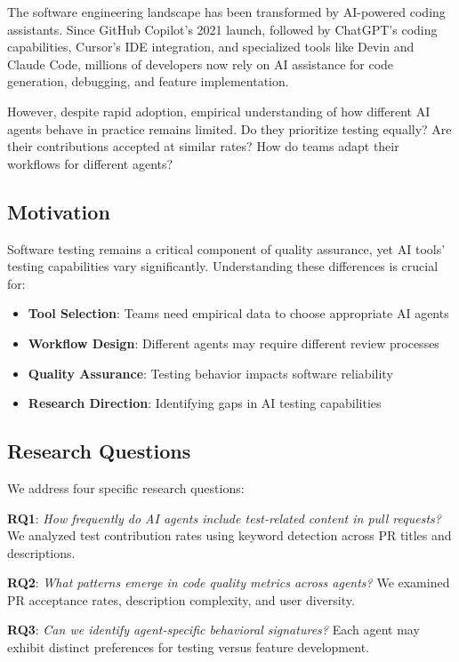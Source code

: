 \documentclass[conference]{IEEEtran}
\begin{document}
The software engineering landscape has been transformed by AI-powered coding assistants. Since GitHub Copilot's 2021 launch, followed by ChatGPT's coding capabilities, Cursor's IDE integration, and specialized tools like Devin and Claude Code, millions of developers now rely on AI assistance for code generation, debugging, and feature implementation.

However, despite rapid adoption, empirical understanding of how different AI agents behave in practice remains limited. Do they prioritize testing equally? Are their contributions accepted at similar rates? How do teams adapt their workflows for different agents?

\subsection{Motivation}

Software testing remains a critical component of quality assurance, yet AI tools' testing capabilities vary significantly. Understanding these differences is crucial for:
\begin{itemize}
    \item \textbf{Tool Selection}: Teams need empirical data to choose appropriate AI agents
    \item \textbf{Workflow Design}: Different agents may require different review processes  
    \item \textbf{Quality Assurance}: Testing behavior impacts software reliability
    \item \textbf{Research Direction}: Identifying gaps in AI testing capabilities
\end{itemize}

\subsection{Research Questions}

We address four specific research questions:

\textbf{RQ1}: \textit{How frequently do AI agents include test-related content in pull requests?} We analyzed test contribution rates using keyword detection across PR titles and descriptions.

\textbf{RQ2}: \textit{What patterns emerge in code quality metrics across agents?} We examined PR acceptance rates, description complexity, and user diversity.

\textbf{RQ3}: \textit{Can we identify agent-specific behavioral signatures?} Each agent may exhibit distinct preferences for testing versus feature development.
\end{document}
